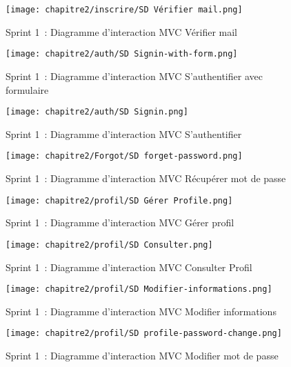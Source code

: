 \begin{figure}[H]
    \centering
    \texttt{[image: chapitre2/inscrire/SD Vérifier mail.png]}
    \caption{Sprint 1~: Diagramme d'interaction MVC \og Vérifier mail \fg{}}
    \label{fig:3.8}
\end{figure}
\begin{figure}[H]
  \centering
  \texttt{[image: chapitre2/auth/SD Signin-with-form.png]}
  \caption{Sprint 1~: Diagramme d'interaction MVC \og S'authentifier avec formulaire \fg{}}
  \label{fig:3.11}
\end{figure}
\begin{figure}[H]
    \centering
    \texttt{[image: chapitre2/auth/SD Signin.png]}
    \caption{Sprint 1~: Diagramme d'interaction MVC \og S'authentifier \fg{}}
    \label{fig:3.12}
\end{figure}
\begin{figure}[H]
    \centering
    \texttt{[image: chapitre2/Forgot/SD forget-password.png]}
    \caption{Sprint 1~: Diagramme d'interaction MVC \og Récupérer mot de passe \fg{}}
    \label{fig:3.13}
\end{figure}
\begin{figure}[H]
    \centering
    \texttt{[image: chapitre2/profil/SD Gérer Profile.png]}
    \caption{Sprint 1~: Diagramme d'interaction MVC \og Gérer profil \fg{}}
    \label{fig:3.24}
\end{figure}

\begin{figure}[H]
  \centering
  \texttt{[image: chapitre2/profil/SD Consulter.png]}
  \caption{Sprint 1~: Diagramme d'interaction MVC \og Consulter Profil \fg{}}
  \label{fig:3.25}
\end{figure}

\begin{figure}[H]
  \centering
  \texttt{[image: chapitre2/profil/SD Modifier-informations.png]}
  \caption{Sprint 1~: Diagramme d'interaction MVC \og Modifier informations \fg{}}
  \label{fig:3.26}
\end{figure}

\begin{figure}[H]
  \centering
  \texttt{[image: chapitre2/profil/SD profile-password-change.png]}
  \caption{Sprint 1~: Diagramme d'interaction MVC \og Modifier mot de passe \fg{}}
  \label{fig:3.27}
\end{figure}

